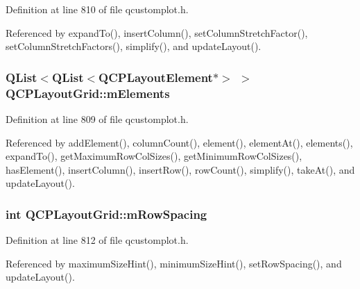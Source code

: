 Definition at line 810 of file qcustomplot.\+h.



Referenced by expand\+To(), insert\+Column(), set\+Column\+Stretch\+Factor(), set\+Column\+Stretch\+Factors(), simplify(), and update\+Layout().

\hypertarget{class_q_c_p_layout_grid_a3577d3855bf8ad20ef9079291a49f397}{}
\subsubsection[{m\+Elements}]{\setlength{\rightskip}{0pt plus 5cm}Q\+List$<$Q\+List$<${\bf Q\+C\+P\+Layout\+Element}$\ast$$>$ $>$ Q\+C\+P\+Layout\+Grid\+::m\+Elements\hspace{0.3cm}{\ttfamily [protected]}}\label{class_q_c_p_layout_grid_a3577d3855bf8ad20ef9079291a49f397}


Definition at line 809 of file qcustomplot.\+h.



Referenced by add\+Element(), column\+Count(), element(), element\+At(), elements(), expand\+To(), get\+Maximum\+Row\+Col\+Sizes(), get\+Minimum\+Row\+Col\+Sizes(), has\+Element(), insert\+Column(), insert\+Row(), row\+Count(), simplify(), take\+At(), and update\+Layout().

\hypertarget{class_q_c_p_layout_grid_a8b67f183f4645739cc4c794d75843b40}{}
\subsubsection[{m\+Row\+Spacing}]{\setlength{\rightskip}{0pt plus 5cm}int Q\+C\+P\+Layout\+Grid\+::m\+Row\+Spacing\hspace{0.3cm}{\ttfamily [protected]}}\label{class_q_c_p_layout_grid_a8b67f183f4645739cc4c794d75843b40}


Definition at line 812 of file qcustomplot.\+h.



Referenced by maximum\+Size\+Hint(), minimum\+Size\+Hint(), set\+Row\+Spacing(), and update\+Layout().

\hypertarget{class_q_c_p_layout_grid_a36c85a7eaf342680fb9b8a4977486f16}{}
